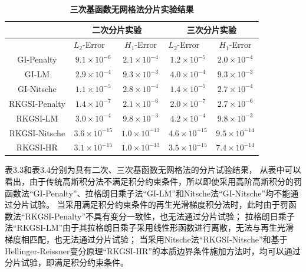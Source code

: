 \begin{table}[H]
\caption{\textbf{三次基函数无网格法分片实验结果}}
\centering
\begin{tabular}{ccccc}
   \toprule
   $\quad$&\multicolumn{2}{c}{二次分片实验}&\multicolumn{2}{c}{三次分片实验}\\
   \midrule
   &$L_2$-Error$\quad$&$H_1$-Error&$L_2$-Error$\quad$&$H_1$-Error\\
   \midrule
   GI-Penalty&$9.1\times10^{-6}$&$2.1\times10^{-4}$&$1.2\times10^{-5}$&$2.0\times10^{-4}$\\
   GI-LM&$2.9\times10^{-4}$&$9.3\times10^{-3}$&$4.0\times10^{-4}$&$9.3\times10^{-3}$\\
   GI-Nitsche&$1.1\times10^{-5}$&$2.8\times10^{-4}$&$1.4\times10^{-5}$&$2.7\times10^{-4}$\\
  RKGSI-Penalty&$1.4\times10^{-7}$&$2.1\times10^{-6}$&$2.0\times10^{-7}$&$2.7\times10^{-6}$\\
  RKGSI-LM&$3.0\times10^{-4}$&$9.8\times10^{-3}$&$4.2\times10^{-4}$&$9.8\times10^{-3}$\\
  RKGSI-Nitsche&$3.6\times10^{-15}$&$1.0\times10^{-13}$&$4.6\times10^{-15}$&$9.5\times10^{-14}$\\
  RKGSI-HR&$3.1\times10^{-15}$&$1.0\times10^{-13}$&$3.5\times10^{-15}$&$7.4\times10^{-14}$\\
   \bottomrule
\end{tabular}
\end{table}
表3.3和表3.4分别为具有二次、三次基函数无网格法的分片试验结果，
从表中可以看出，由于传统高斯积分法不满足积分约束条件，所以即使采用高阶高斯积分的罚函数法“GI-Penalty”、拉格朗日乘子法“GI-LM”和Nitsche法“GI-Nitsche”均不能通过分片试验。
当采用满足积分约束条件的再生光滑梯度积分法时，此时由于罚函数法“RKGSI-Penalty”不具有变分一致性，也无法通过分片试验；
拉格朗日乘子法“RKGSI-LM”由于其拉格朗日乘子采用线性形函数进行离散，无法与再生光滑梯度相匹配，也无法通过分片试验；
当采用Nitsche法“RKGSI-Nitsche”和基于Hellinger-Reissner变分原理“RKGSI-HR”的本质边界条件施加方法时，均可以通过分片试验，即满足积分约束条件。
